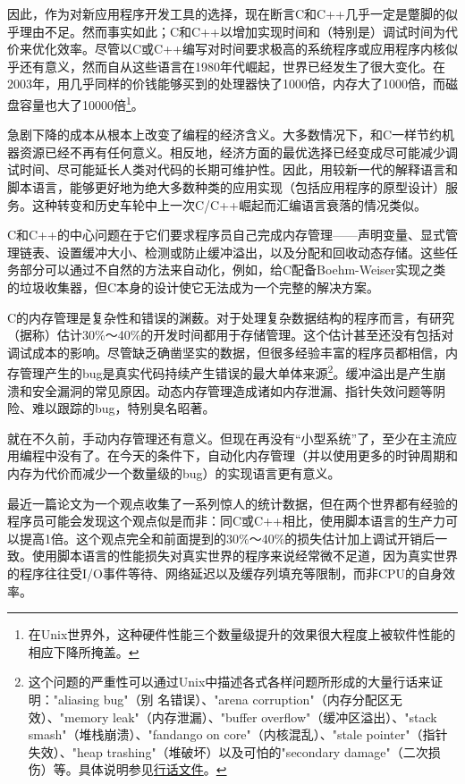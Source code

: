 \documentclass[12pt,oneside]{book}
\begin{document}
\begin{common-format}
因此，作为对新应用程序开发工具的选择，现在断言C和C++几乎一定是蹩脚的似乎理由不足。然而事实如此；C和C++以增加实现时间和（特别是）调试时间为代价来优化效率。尽管以C或C++编写对时间要求极高的系统程序或应用程序内核似乎还有意义，然而自从这些语言在1980年代崛起，世界已经发生了很大变化。在2003年，用几乎同样的价钱能够买到的处理器快了1000倍，内存大了1000倍，而磁盘容量也大了10000倍\footnote{在Unix世界外，这种硬件性能三个数量级提升的效果很大程度上被软件性能的相应下降所掩盖。}。

急剧下降的成本从根本上改变了编程的经济含义。大多数情况下，和C一样节约机器资源已经不再有任何意义。相反地，经济方面的最优选择已经变成尽可能减少调试时间、尽可能延长人类对代码的长期可维护性。因此，用较新一代的解释语言和脚本语言，能够更好地为绝大多数种类的应用实现（包括应用程序的原型设计）服务。这种转变和历史车轮中上一次C/C++崛起而汇编语言衰落的情况类似。

C和C++的中心问题在于它们要求程序员自己完成内存管理——声明变量、显式管理链表、设置缓冲大小、检测或防止缓冲溢出，以及分配和回收动态存储。这些任务部分可以通过不自然的方法来自动化，例如，给C配备Boehm-Weiser实现之类的垃圾收集器，但C本身的设计使它无法成为一个完整的解决方案。

C的内存管理是复杂性和错误的渊薮。对于处理复杂数据结构的程序而言，有研究（据\cite{Boehm}称）估计30\%{}～40\%{}的开发时间都用于存储管理。这个估计甚至还没有包括对调试成本的影响。尽管缺乏确凿坚实的数据，但很多经验丰富的程序员都相信，内存管理产生的bug是真实代码持续产生错误的最大单体来源\footnote{这个问题的严重性可以通过Unix中描述各式各样问题所形成的大量行话来证明："aliasing bug"（别      
名错误）、"arena corruption"（内存分配区无效）、"memory leak"（内存泄漏）、"buffer overflow"（缓冲区溢出）、"stack smash"（堆栈崩溃）、"fandango on core"（内核混乱）、"stale pointer"（指针失效）、"heap trashing"（堆破坏）以及可怕的"secondary damage"（二次损伤）等。具体说明参见\href{http://www.catb.org/~esr/jargon}{行话文件}。}。缓冲溢出是产生崩溃和安全漏洞的常见原因。动态内存管理造成诸如内存泄漏、指针失效问题等阴险、难以跟踪的bug，特别臭名昭著。

就在不久前，手动内存管理还有意义。但现在再没有“小型系统”了，至少在主流应用编程中没有了。在今天的条件下，自动化内存管理（并以使用更多的时钟周期和内存为代价而减少一个数量级的bug）的实现语言更有意义。

最近一篇论文\cite{Prechelt}为一个观点收集了一系列惊人的统计数据，但在两个世界都有经验的程序员可能会发现这个观点似是而非：同C或C++相比，使用脚本语言的生产力可以提高1倍。这个观点完全和前面提到的30\%{}～40\%{}的损失估计加上调试开销后一致。使用脚本语言的性能损失对真实世界的程序来说经常微不足道，因为真实世界的程序往往受I/O事件等待、网络延迟以及缓存列填充等限制，而非CPU的自身效率。


\end{common-format}
\end{document}
